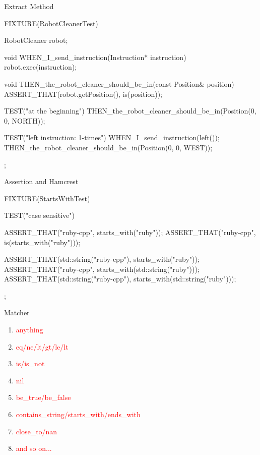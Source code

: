 \begin{frame}[fragile]{Extract Method}
\begin{c++}
FIXTURE(RobotCleanerTest)
{
    RobotCleaner robot;

    void WHEN_I_send_instruction(Instruction* instruction)
    {
        robot.exec(instruction);
    }

    void THEN_the_robot_cleaner_should_be_in(const Position& position)
    {
        ASSERT_THAT(robot.getPosition(), is(position));
    }

    TEST("at the beginning")
    {
        THEN_the_robot_cleaner_should_be_in(Position(0, 0, NORTH));
    }

    TEST("left instruction: 1-times")
    {
        WHEN_I_send_instruction(left());
        THEN_the_robot_cleaner_should_be_in(Position(0, 0, WEST));
    }
};
\end{c++}
\end{frame}

\begin{frame}[fragile]{Assertion and Hamcrest}
\begin{c++}
FIXTURE(StartsWithTest)
{
    TEST("case sensitive")
    {
        ASSERT_THAT("ruby-cpp", starts_with("ruby"));
        ASSERT_THAT("ruby-cpp", is(starts_with("ruby")));

        ASSERT_THAT(std::string("ruby-cpp"), starts_with("ruby"));
        ASSERT_THAT("ruby-cpp", starts_with(std::string("ruby")));
        ASSERT_THAT(std::string("ruby-cpp"), starts_with(std::string("ruby")));
    }
};
\end{c++}
\end{frame}

\begin{frame}{Matcher}
  \begin{enumerate}
    \item \textcolor{red}{anything}
    \item \textcolor{red}{eq/ne/lt/gt/le/lt}
    \item \textcolor{red}{is/is\_not}
    \item \textcolor{red}{nil}
    \item \textcolor{red}{be\_true/be\_false}
    \item \textcolor{red}{contains\_string/starts\_with/ends\_with}
    \item \textcolor{red}{close\_to/nan}
    \item \textcolor{red}{and so on...}
  \end{enumerate}
\end{frame}

